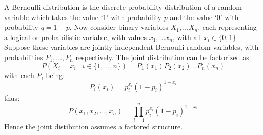 \documentclass[encoding=utf8,british]{tumphthesis}
\begin{document}
        \begin{tcolorbox}[breakable, width=\linewidth, sharp corners=all, colback=white!95!black]
        
        A Bernoulli distribution is the discrete probability distribution of a random variable which takes the value `1' with probability $p$ and the value `0' with probability $q = 1-p$.
        Now consider binary variables $X_1, \dots X_n$, each representing a logical or probabilistic variable, with values $x_1, \dots x_n$, with all $x_i \in \{0, 1\}$. Suppose these variables are jointly 
        independent Bernoulli random variables, with probabilities $P_1, \dots, P_n$ respectively. The joint distribution can be factorized as:
        \begin{equation*}
            P(X_i = x_i \; | \; i \in \{1, \dots, n\}) = P_1(x_1)P_2(x_2)\dots P_n(x_n)
        \end{equation*}
        with each $P_i$ being:
        \begin{equation*}
            P_i(x_i) = p_i^{x_i}(1-p_i)^{1-x_i}
        \end{equation*}
        thus:
        \begin{equation*}
            P(x_1, x_2, \dots , x_n) = \prod_{i = 1}^n p_i^{x_i}(1-p_i)^{1-x_i}
        \end{equation*}
        Hence the joint distibution assumes a factored structure.
        \end{tcolorbox}
\end{document}
